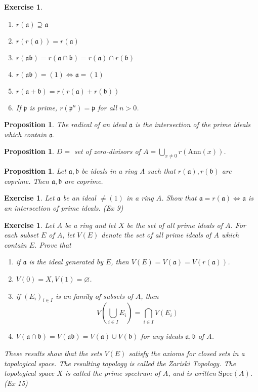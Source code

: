\documentclass[]{report}
\newtheorem{prop}[theorem]{Proposition}
\newtheorem{exercise}[theorem]{Exercise}
\begin{document}
\begin{exercise}
    \begin{enumerate}
        \item $r(\mathfrak{a}) \supseteq \mathfrak{a}$
        \item $r(r(\mathfrak{a})) = r(\mathfrak{a})$
        \item $r(\mathfrak{ab}) = r(\mathfrak{a\cap b}) = r(\mathfrak{a}) \cap r(\mathfrak{b})$
        \item $r(\mathfrak{ab}) = (1) \Leftrightarrow \mathfrak{a} = (1)$
        \item $r(\mathfrak{a+b}) = r(r(\mathfrak{a}) + r(\mathfrak{b}))$
        \item If $\mathfrak{p}$ is prime, $r(\mathfrak{p}^n) = \mathfrak{p}$ for all $n>0$.
    \end{enumerate}
\end{exercise}

\begin{prop}
    The radical of an ideal $\mathfrak{a}$ is the intersection of the prime ideals which contain $\mathfrak{a}$.
\end{prop}

\begin{prop}
    $D =$ set of zero-divisors of $A = \bigcup_{x\neq 0} r(\text{Ann}(x))$.
\end{prop}

\begin{prop}
    Let $\mathfrak{a,b}$ be ideals in a ring A such that $r(\mathfrak{a}), r(\mathfrak{b})$ are coprime. Then $\mathfrak{a,b}$ are coprime.
\end{prop}

\begin{exercise}
    Let $\mathfrak{a}$ be an ideal $\neq (1)$ in a ring $A$. Show that $\mathfrak{a} = r(\mathfrak{a}) \Leftrightarrow \mathfrak{a}$ is an intersection of prime ideals. (Ex 9)
\end{exercise} 

\begin{exercise}
    Let $A$ be a ring and let $X$ be the set of all prime ideals of $A$. For each subset $E$ of $A$, let $V(E)$ denote the set of all prime ideals of $A$ which contain $E$. Prove that
    \begin{enumerate}
        \item if $\mathfrak{a}$ is the ideal generated by $E$, then $V(E) = V(\mathfrak{a}) = V(r(\mathfrak{a}))$.
        \item $V(0) = X, V(1) = \varnothing$.
        \item if $(E_i)_{i\in I}$ is an family of subsets of $A$, then
            $$V(\bigcup_{i\in I} E_i) = \bigcap_{i\in I} V(E_i)$$
        \item $V(\mathfrak{a\cap b}) = V(\mathfrak{ab}) = V(\mathfrak{a}) \cup V(\mathfrak{b})$ for any ideals $\mathfrak{a, b}$ of $A$. 
    \end{enumerate}
    These results show that the sets $V(E)$ satisfy the axioms for closed sets in a topological space. The resulting topology is called the Zariski Topology. The topological space $X$ is called the prime spectrum of $A$, and is written $\text{Spec}(A)$. (Ex 15)
\end{exercise}
\end{document}
